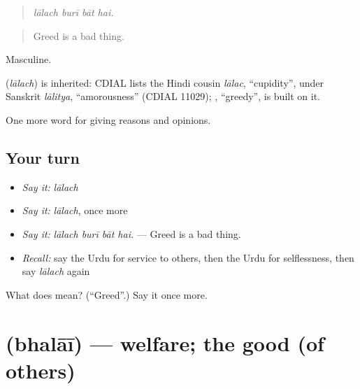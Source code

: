 \begin{quote}
   
\end{quote}

\begin{quote}
\emph{lālach burī bāt hai.}
\end{quote}

\begin{quote}
Greed is a bad thing.
\end{quote}

Masculine.

\begin{cousinweb}
\textbf{} (\emph{lālach}) is inherited: CDIAL lists the Hindi cousin \emph{lālac}, \textquotedblleft{}cupidity\textquotedblright{}, under Sanskrit \emph{lālitya}, \textquotedblleft{}amorousness\textquotedblright{} (CDIAL 11029); \textbf{}, \textquotedblleft{}greedy\textquotedblright{}, is built on it.
\end{cousinweb}

\begin{grammarlens}[title={What you've built}]
One more word for giving reasons and opinions.
\end{grammarlens}

\subsection*{Your turn}
\begin{itemize}
\raggedright
  \item \emph{Say it:} \emph{lālach}
  \item \emph{Say it:} \emph{lālach}, once more
  \item \emph{Say it:} \emph{lālach burī bāt hai.} — Greed is a bad thing.
  \item \emph{Recall:} say the Urdu for service to others, then the Urdu for selflessness, then say \emph{lālach} again
\end{itemize}

\begin{tcolorbox}[breakable,colback=teal!4,colframe=teal!35!black,title={Before you move on}]
What does  mean? (\textquotedblleft{}Greed\textquotedblright{}.) Say it once more.
\end{tcolorbox}
\section[\texorpdfstring{\ur{بھلائی} (bhalāī)}{بھلائی (bhalāī)}]{ (bhalāī) — welfare; the good (of others)}

